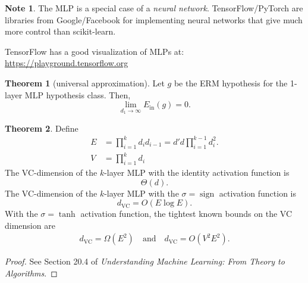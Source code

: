 \documentclass[10pt]{exam}
\theoremstyle{definition}
\newtheorem{note}{Note}
\newtheorem{theorem}{Theorem}
\DeclareMathOperator{\sign}{sign}
\newcommand{\Ein}{E_{\text{in}}}
\newcommand{\dvc}{{d_{\text{VC}}}}
\begin{document}
\vspace{4in}
\begin{note}
    The MLP is a special case of a \emph{neural network}.
    TensorFlow/PyTorch are libraries from Google/Facebook for implementing neural networks that give much more control than scikit-learn.

    TensorFlow has a good visualization of MLPs at:
    \url{https://playground.tensorflow.org}
\end{note}

\newpage
\begin{theorem}[universal approximation]
    Let $g$ be the ERM hypothesis for the 1-layer MLP hypothesis class.
    Then,
    \begin{equation}
        \lim_{d_1\to\infty} \Ein(g) = 0
        .
    \end{equation}
\end{theorem}

\begin{theorem}
    Define
    \begin{align}
        \label{eq:E}
        E &= \prod_{i=1}^k d_i d_{i-1} = d'd \prod_{i=1}^{k-1} d_i^2.
        \\
        V &= \prod_{i=1}^k d_i
    \end{align}
    The VC-dimension of the $k$-layer MLP with the identity activation function is
    \begin{equation}
        \Theta(d)
        .
    \end{equation}
    The VC-dimension of the $k$-layer MLP with the $\sigma=\sign$ activation function is
    \begin{equation}
        \dvc = O(E \log E)
        .
    \end{equation}
    With the $\sigma=\tanh$ activation function, the tightest known bounds on the VC dimension are
    \begin{align}
        \dvc = \Omega(E^2) \quad\text{and}\quad
        \dvc = O(V^2 E^2)
        .
    \end{align}
\end{theorem}

\begin{proof}
    See Section 20.4 of \emph{Understanding Machine Learning: From Theory to Algorithms}.
\end{proof}
\end{document}
